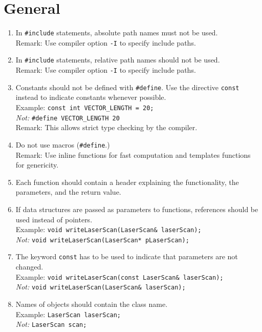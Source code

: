 
\section{General}
\label{SEC_GENERAL}

\begin{enumerate}
\item In {\tt \#include} statements, absolute path names must not be used. \\
  Remark: Use compiler option {\tt -I} to specify include paths.
\item In {\tt \#include} statements, relative path names should not be used. \\
  Remark: Use compiler option {\tt -I} to specify include paths.
\item \label{ITEM_NO_DEFINES} Constants should not be defined with
  {\tt \#define}. Use the directive {\tt const} instead to indicate
  constants whenever possible. \\ 
  Example: {\tt const int VECTOR\_LENGTH = 20;} \\ 
  {\em Not:} {\tt \#define VECTOR\_LENGTH 20} \\ 
  Remark: This allows strict type checking by the compiler.
\item \label{ITEM_NO_MACROS} Do not use macros ({\tt \#define}.) \\
  Remark: Use inline functions for fast computation and templates functions for
  genericity.
\item Each function should contain a header explaining the
  functionality, the parameters, and the return value.
\item If data structures are passed as parameters to functions,
  references should be used instead of pointers. \\ 
  Example: {\tt void writeLaserScan(LaserScan\& laserScan);} \\
  {\em Not:} {\tt void writeLaserScan(LaserScan* pLaserScan);} 
\item The keyword {\tt const} has to be used to indicate that
  parameters are not changed. \\ 
  Example: {\tt void writeLaserScan(const LaserScan\& laserScan);} \\
  {\em Not:} {\tt void writeLaserScan(LaserScan\& laserScan);}
\item Names of objects should contain the class name. \\
  Example: {\tt LaserScan laserScan;} \\
  {\em Not:} {\tt LaserScan scan;} 
\end{enumerate}



